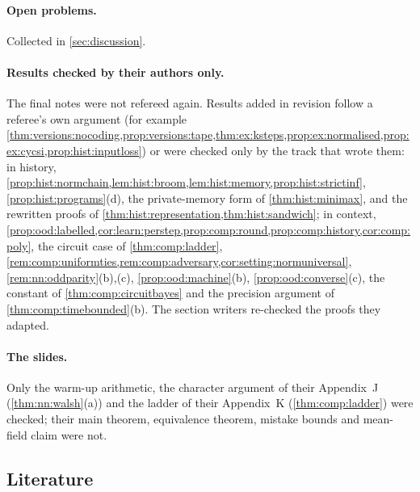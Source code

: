 \paragraph{Open problems.} Collected in \cref{sec:discussion}.

\paragraph{Results checked by their authors only.} The final notes were not refereed again. Results added in revision follow a referee's own argument (for example \cref{thm:versions:nocoding,prop:versions:tape,thm:ex:ksteps,prop:ex:normalised,prop:ex:cycsi,prop:hist:inputloss}) or were checked only by the track that wrote them: in history, \cref{prop:hist:normchain,lem:hist:broom,lem:hist:memory,prop:hist:strictinf}, \cref{prop:hist:programs}(d), the private-memory form of \cref{thm:hist:minimax}, and the rewritten proofs of \cref{thm:hist:representation,thm:hist:sandwich}; in context, \cref{prop:ood:labelled,cor:learn:perstep,prop:comp:round,prop:comp:history,cor:comp:poly}, the circuit case of \cref{thm:comp:ladder}, \cref{rem:comp:uniformties,rem:comp:adversary,cor:setting:normuniversal}, \cref{rem:nn:oddparity}(b),(c), \cref{prop:ood:machine}(b), \cref{prop:ood:converse}(c), the constant of \cref{thm:comp:circuitbayes} and the precision argument of \cref{thm:comp:timebounded}(b). The section writers re-checked the proofs they adapted.

\paragraph{The slides.} Only the warm-up arithmetic, the character argument of their Appendix~J (\cref{thm:nn:walsh}(a)) and the ladder of their Appendix~K (\cref{thm:comp:ladder}) were checked; their main theorem, equivalence theorem, mistake bounds and mean-field claim were not.

\subsection{Literature}\label{app:verification:literature}

